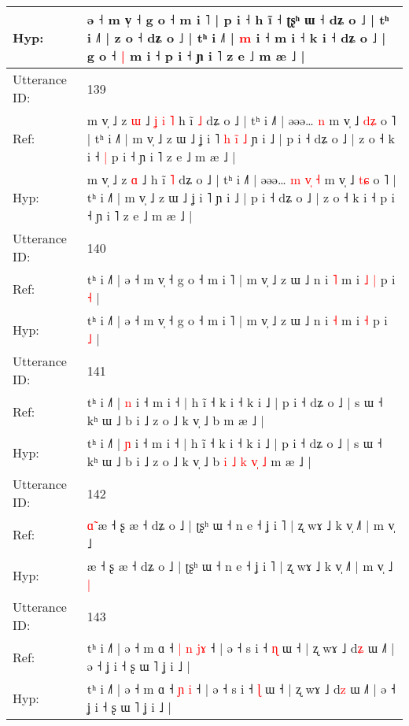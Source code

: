 \documentclass[10pt]{article}
\DeclareRobustCommand{\hl}[1]{{\textcolor{red}{#1}}}
\begin{document}
\begin{longtable}{ll}
 \\
Hyp: & ə ˧ m v̩ ˧ g o ˧ m i ˥ | p i ˧ h ĩ ˧\hl{}\hl{} ʈʂʰ ɯ ˧ dʑ o ˩ | tʰ i ˩˥ | z o ˧ dʑ o ˩ | tʰ i ˩˥ |\hl{}\hl{} \hl{m} i ˧ m i ˧ k i ˧ dʑ o ˩ | g o ˧\hl{ }\hl{|} m i ˧ p i ˧ ɲ i ˥ z e ˩ m æ ˩ |
 \\
\midrule
Utterance ID: & 139 \\
Ref: & m v̩ ˩ z \hl{ɯ} ˩\hl{ }\hl{ʝ}\hl{ }\hl{i}\hl{ }\hl{˥} h ĩ \hl{˩} dʑ o ˩ | tʰ i ˩˥ | əəə…\hl{}\hl{}\hl{}\hl{}\hl{} \hl{n} m v̩ ˩ \hl{d}\hl{ʑ} o ˥ | tʰ i ˩˥ | m v̩ ˩ z ɯ ˩ ʝ i ˥\hl{ }\hl{h}\hl{ }\hl{i}\hl{̃}\hl{ }\hl{˩} ɲ i ˩ | p i ˧ dʑ o ˩ | z o ˧ k i ˧\hl{ }\hl{|} p i ˧ ɲ i ˥ z e ˩ m æ ˩ |
 \\
Hyp: & m v̩ ˩ z \hl{ɑ} ˩\hl{}\hl{}\hl{}\hl{}\hl{}\hl{} h ĩ \hl{˥} dʑ o ˩ | tʰ i ˩˥ | əəə…\hl{ }\hl{m}\hl{ }\hl{v}\hl{̩} \hl{˧} m v̩ ˩ \hl{t}\hl{ɕ} o ˥ | tʰ i ˩˥ | m v̩ ˩ z ɯ ˩ ʝ i ˥\hl{}\hl{}\hl{}\hl{}\hl{}\hl{}\hl{} ɲ i ˩ | p i ˧ dʑ o ˩ | z o ˧ k i ˧\hl{}\hl{} p i ˧ ɲ i ˥ z e ˩ m æ ˩ |
 \\
\midrule
Utterance ID: & 140 \\
Ref: & tʰ i ˩˥ | ə ˧ m v̩ ˧ g o ˧ m i ˥ | m v̩ ˩ z ɯ ˩ n i \hl{˥} m i\hl{ }\hl{˩} \hl{|} p i \hl{˧} |
 \\
Hyp: & tʰ i ˩˥ | ə ˧ m v̩ ˧ g o ˧ m i ˥ | m v̩ ˩ z ɯ ˩ n i \hl{˧} m i\hl{}\hl{} \hl{˧} p i \hl{˩} |
 \\
\midrule
Utterance ID: & 141 \\
Ref: & tʰ i ˩˥ | \hl{n} i ˧ m i ˧ | h ĩ ˧ k i ˧ k i ˩ | p i ˧ dʑ o ˩ | s ɯ ˧ kʰ ɯ ˩ b i ˩ z o ˩ k v̩ ˩ b\hl{}\hl{}\hl{}\hl{}\hl{}\hl{}\hl{}\hl{}\hl{}\hl{}\hl{} m æ ˩ |
 \\
Hyp: & tʰ i ˩˥ | \hl{ɲ} i ˧ m i ˧ | h ĩ ˧ k i ˧ k i ˩ | p i ˧ dʑ o ˩ | s ɯ ˧ kʰ ɯ ˩ b i ˩ z o ˩ k v̩ ˩ b\hl{ }\hl{i}\hl{ }\hl{˩}\hl{ }\hl{k}\hl{ }\hl{v}\hl{̩}\hl{ }\hl{˩} m æ ˩ |
 \\
\midrule
Utterance ID: & 142 \\
Ref: & \hl{ɑ}\hl{̃}\hl{ }æ ˧ ʂ æ ˧ dʑ o ˩ | ʈʂʰ ɯ ˧ n e ˧ ʝ i ˥ | ʐ wɤ ˩ k v̩ ˩˥ | m v̩ ˩\hl{}\hl{}
 \\
Hyp: & \hl{}\hl{}\hl{}æ ˧ ʂ æ ˧ dʑ o ˩ | ʈʂʰ ɯ ˧ n e ˧ ʝ i ˥ | ʐ wɤ ˩ k v̩ ˩˥ | m v̩ ˩\hl{ }\hl{|}
 \\
\midrule
Utterance ID: & 143 \\
Ref: & tʰ i ˩˥ | ə ˧ m ɑ ˧\hl{ }\hl{|} \hl{n} \hl{j}\hl{ɤ} ˧ | ə ˧ s i ˧ \hl{ɳ} ɯ ˧ | ʐ wɤ ˩ d\hl{ʑ} ɯ ˩˥ | ə ˧ ʝ i ˧ ʂ ɯ ˥ ʝ i ˩ |
 \\
Hyp: & tʰ i ˩˥ | ə ˧ m ɑ ˧\hl{}\hl{} \hl{ɲ} \hl{}\hl{i} ˧ | ə ˧ s i ˧ \hl{ɭ} ɯ ˧ | ʐ wɤ ˩ d\hl{z} ɯ ˩˥ | ə ˧ ʝ i ˧ ʂ ɯ ˥ ʝ i ˩ |

\end{longtable}
\end{document}
